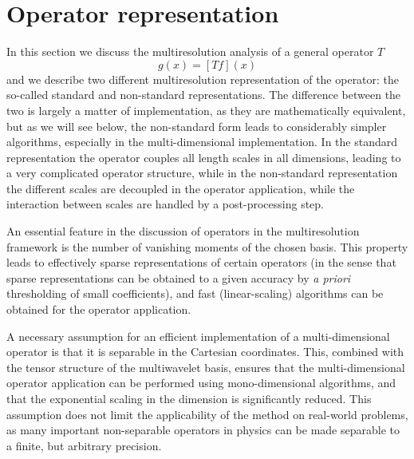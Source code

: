 \section{Operator representation}\label{sec:operator}
In this section we discuss the multiresolution analysis of a general operator $T$
\begin{equation}
    g(x) = [Tf](x)
\end{equation}
and we describe two different multiresolution representation of the operator: the 
so-called standard and non-standard representations. The difference between 
the two is largely a matter of implementation, as they are mathematically equivalent,
but as we will see below, the non-standard form leads to considerably simpler algorithms, 
especially in the multi-dimensional implementation. In the standard representation the
operator couples all length scales in all dimensions, leading to a very complicated
operator structure, while in the non-standard representation the different scales are 
decoupled in the operator application, while the interaction between scales are handled 
by a post-processing step.

An essential feature in the discussion of operators in the multiresolution framework
is the number of vanishing moments of the chosen basis. This property leads to 
effectively sparse representations of certain operators (in the sense that sparse
representations can be obtained to a given accuracy by \emph{a priori} thresholding of 
small coefficients), and fast (linear-scaling) algorithms can be obtained for the operator 
application.

A necessary assumption for an efficient implementation of a multi-dimensional operator
is that it is separable in the Cartesian coordinates. This, combined with the tensor
structure of the multiwavelet basis, ensures that the multi-dimensional operator 
application can be performed using mono-dimensional algorithms, and that the exponential
scaling in the dimension is significantly reduced. This assumption does not
limit the applicability of the method on real-world problems, as many important 
non-separable operators in physics can be made separable to a finite, but arbitrary
precision.


